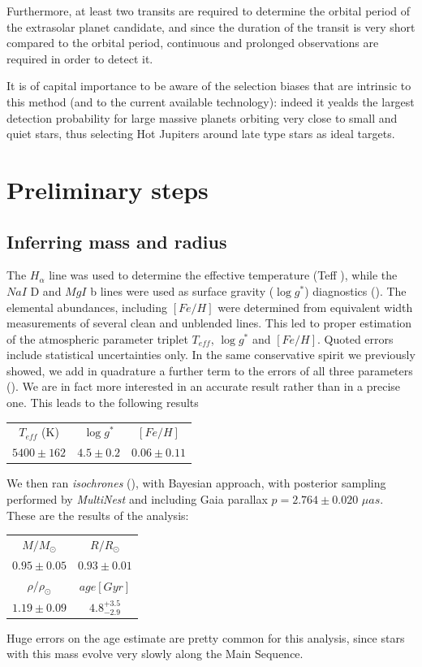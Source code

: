 \documentclass[a4paper,11pt,twocolumn]{article}
\begin{document}
Furthermore, at least two transits are required to determine the orbital period of the extrasolar planet candidate, and since the duration of the transit is very short compared to the orbital period, continuous and prolonged observations are required in order to detect it.

It is of capital importance to be aware of the selection biases that are intrinsic to this method (and to the current available technology): indeed it yealds the largest detection probability for large massive planets orbiting very close to small and quiet stars, thus selecting Hot Jupiters around late type stars as ideal targets.

\section{Preliminary steps}

\subsection{Inferring mass and radius}

The $H_{\alpha}$ line was used to determine the effective temperature (Teff ),
while the $NaI$ D and $MgI$ b lines were used as surface gravity
($\log{g^*}$) diagnostics (\cite{Anderson}). The elemental abundances, including $[Fe/H]$ 
were determined from equivalent width measurements of several clean and 
unblended lines. This led to proper estimation of the atmospheric parameter 
triplet $T_{eff}$, $\log{g^*}$ and $[Fe/H]$. Quoted errors include statistical 
uncertainties only. In the same conservative spirit we 
previously showed, we add in quadrature a further term to the errors of 
all three parameters (\cite{Sousa}). We are in fact more interested in an 
accurate result rather than in a precise one.
This leads to the following results 
\begin{center}
    \begin{tabular}{|c|c|c|}
    \hline
    $T_{eff}$ (K) & $\log{g^*}$ & $[Fe/H]$ \\
    $5400 \pm 162$ & $4.5 \pm 0.2$ & $0.06 \pm 0.11$ \\
    \hline
    \end{tabular}
\end{center}
We then ran \textit{isochrones} (\cite{Morton}), with Bayesian approach, 
with posterior sampling performed by \textit{MultiNest} and including Gaia 
parallax $p=2.764 \pm 0.020$ $\mu as$. These are the results of the 
analysis:
\begin{center}
    \begin{tabular}{|c|c|}
    \hline
    $M/M_{\odot}$ & $R/R_{\odot}$  \\
    $0.95\pm0.05$ & $0.93 \pm 0.01$  \\
    \hline
    $\rho/\rho_{\odot}$ & $age[Gyr]$ \\
    $1.19 \pm 0.09$ & $4.8^{+3.5}_{-2.9}$ \\
    \hline
    \end{tabular}
\end{center}
Huge errors on the age estimate are pretty common for this analysis, since 
stars with this mass evolve very slowly along the Main Sequence.
\end{document}

